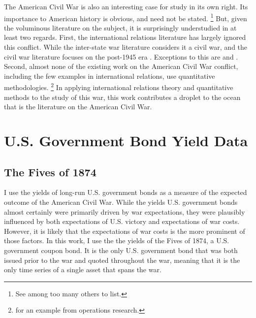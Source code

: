 The American Civil War is also an interesting case for study in its own right.
Its importance to American history is obvious, and need not be stated.%
\footnote{See \textcite{McPherson2003} among too many others to list.}
But, given the voluminous literature on the subject, it is surprisingly understudied in at least two regards. %
First, the international relations literature has largely ignored this conflict.
While the inter-state war literature considers it a civil war, and the civil war literature focuses on the post-1945 era \parencites[140-141]{Reiter2009}[2]{Poast2012}. %
Exceptions to this are \textcite{Reiter2009} and \textcite{Poast2012}.
Second, almost none of the existing work on the American Civil War conflict, including the few examples in international relations, use quantitative methodologies. %
\footnote{\textcite{Weiss1966} for an example from operations research.}
In applying international relations theory and quantitative methods to the study of this war, this work contributes a droplet to the ocean that is the literature on the American Civil War.



\section{U.S. Government Bond Yield Data}
\label{sec:why-prices-study}



\subsection{The Fives of 1874}
\label{sec:5s-1874}

I use the yields of long-run U.S. government bonds as a measure of the expected outcome of the American Civil War.
While the yields U.S. government bonds almost certainly were primarily driven by war expectations, they were plausibly influenced by both expectations of U.S. victory and expectations of war costs.
However, it is likely that the expectations of war costs is the more prominent of those factors.
In this work, I use the the yields of the Fives of 1874, a U.S. government coupon bond.
It is the only U.S. government bond that was both issued prior to the war and quoted throughout the war, meaning that it is the only time series of a single asset that spans the war.

